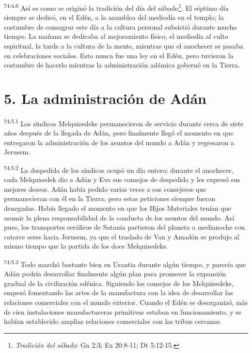 \par
\textsuperscript{74:4.6} Así es como se originó la tradición del día del sábado\footnote{\textit{Tradición del sábado}: Gn 2:3; Ex 20:8-11; Dt 5:12-15.}. El séptimo día siempre se dedicó, en el Edén, a la asamblea del mediodía en el templo; la costumbre de consagrar este día a la cultura personal subsistió durante mucho tiempo. La mañana se dedicaba al mejoramiento físico, el mediodía al culto espiritual, la tarde a la cultura de la mente, mientras que el anochecer se pasaba en celebraciones sociales. Esto nunca fue una ley en el Edén, pero tuvieron la costumbre de hacerlo mientras la administración adámica gobernó en la Tierra.

\section*{5. La administración de Adán}
\par
\textsuperscript{74:5.1} Los síndicos Melquisedeks permanecieron de servicio durante cerca de siete años después de la llegada de Adán, pero finalmente llegó el momento en que entregaron la administración de los asuntos del mundo a Adán y regresaron a Jerusem.

\par
\textsuperscript{74:5.2} La despedida de los síndicos ocupó un día entero; durante el anochecer, cada Melquisedek dio a Adán y Eva sus consejos de despedida y les expresó sus mejores deseos. Adán había pedido varias veces a sus consejeros que permanecieran con él en la Tierra, pero estas peticiones siempre fueron denegadas. Había llegado el momento en que los Hijos Materiales tenían que asumir la plena responsabilidad de la conducta de los asuntos del mundo. Así pues, los transportes seráficos de Satania partieron del planeta a medianoche con catorce seres hacia Jerusem, ya que el traslado de Van y Amadón se produjo al mismo tiempo que la partida de los doce Melquisedeks.

\par
\textsuperscript{74:5.3} Todo marchó bastante bien en Urantia durante algún tiempo, y parecía que Adán podría desarrollar finalmente algún plan para promover la expansión gradual de la civilización edénica. Siguiendo los consejos de los Melquisedeks, empezó fomentando las artes de la manufactura con la idea de desarrollar las relaciones comerciales con el mundo exterior. Cuando el Edén se desorganizó, más de cien instalaciones manufactureras primitivas estaban en funcionamiento, y se habían establecido amplias relaciones comerciales con las tribus cercanas.

